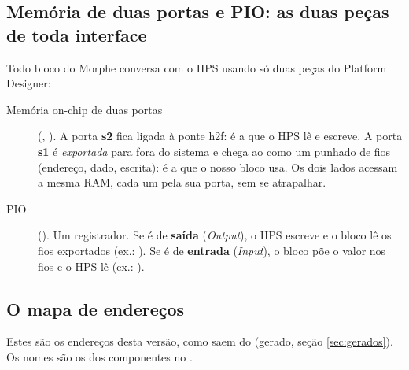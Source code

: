 \documentclass[11pt,a4paper,oneside]{article}
\begin{document}
\subsection{Memória de duas portas e PIO: as duas peças de toda interface}

Todo bloco do Morphe conversa com o HPS usando só duas peças do Platform
Designer:

\begin{description}
  \item[Memória on-chip de duas portas] (,
    ). A porta \textbf{s2} fica ligada à ponte h2f: é
    a que o HPS lê e escreve. A porta \textbf{s1} é \emph{exportada} para fora
    do sistema e chega ao  como um punhado de fios (endereço,
    dado, escrita): é a que o nosso bloco usa. Os dois lados acessam a mesma
    RAM, cada um pela sua porta, sem se atrapalhar.
  \item[PIO] (). Um registrador. Se é de
    \textbf{saída} (\emph{Output}), o HPS escreve e o bloco lê os fios
    exportados (ex.: ). Se é de \textbf{entrada}
    (\emph{Input}), o bloco põe o valor nos fios e o HPS lê (ex.:
    ).
\end{description}

\subsection{O mapa de endereços}

Estes são os endereços desta versão, como saem do  (gerado,
seção \ref{sec:gerados}). Os nomes são os dos componentes no
.
\end{document}
